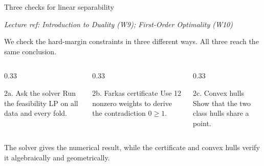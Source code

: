 \documentclass[aspectratio=169,11pt]{beamer}
\newcommand{\lecref}[1]{{\hfill\tiny\color{softgray}\textit{Lecture ref: #1}\par}\vspace{-0.4em}}
\begin{document}
\begin{frame}{Three checks for linear separability}
  \lecref{Introduction to Duality (W9); First-Order Optimality (W10)}
  \vspace{0.4em}
  We check the hard-margin constraints in \alert{three different ways}. All three reach the same conclusion.
  \vspace{0.8em}
  \begin{columns}[T]
    \begin{column}{0.33\textwidth}
      \begin{block}{2a. Ask the solver}
        \small Run the feasibility LP on all data and every fold.
      \end{block}
    \end{column}
    \begin{column}{0.33\textwidth}
      \begin{block}{2b. Farkas certificate}
        \small Use 12 nonzero weights to derive the contradiction $0\ge1$.
      \end{block}
    \end{column}
    \begin{column}{0.33\textwidth}
      \begin{block}{2c. Convex hulls}
        \small Show that the two class hulls share a point.
      \end{block}
    \end{column}
  \end{columns}
  \vspace{0.9em}
  \begin{center}
    \small The solver gives the numerical result, while the certificate and convex hulls verify it algebraically and geometrically.
  \end{center}
\end{frame}
\end{document}
